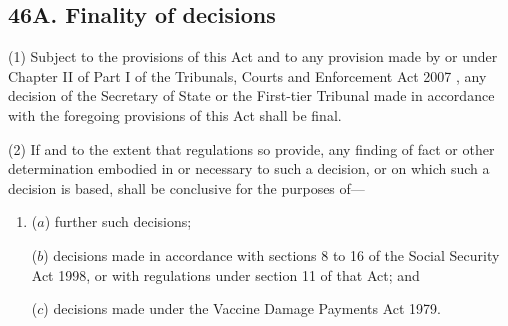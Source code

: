 \documentclass[12pt,a4paper]{article}
\begin{document}

\subsection{46A. Finality of decisions}

(1) Subject to the provisions of this Act
and to any provision made by or under Chapter II of Part I of the Tribunals, Courts and Enforcement Act 2007%
, any decision of 
the Secretary of State or 
the First-tier Tribunal  %
made in accordance with the foregoing provisions of this Act shall be final.

(2) If and to the extent that regulations so provide, any finding of fact or other determination embodied in or necessary to such a decision, or on which such a decision is based, shall be conclusive for the purposes of—
\begin{enumerate}\item[]
($a$) further such decisions;

($b$) decisions made in accordance with sections 8 to 16 of the Social Security Act 1998, or with regulations under section 11 of that Act; and

($c$) decisions made under the Vaccine Damage Payments Act 1979.
\end{enumerate}

\end{document}
